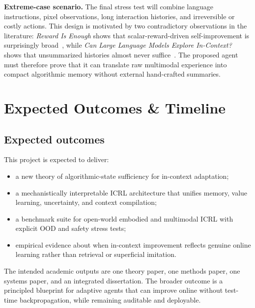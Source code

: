 \documentclass[10pt,twocolumn,letterpaper]{article}
\begin{document}
\textbf{Extreme-case scenario.}
The final stress test will combine language instructions, pixel observations, long interaction histories, and irreversible or costly actions. This design is motivated by two contradictory observations in the literature: \emph{Reward Is Enough} shows that scalar-reward-driven self-improvement is surprisingly broad~\cite{song2025reward}, while \emph{Can Large Language Models Explore In-Context?} shows that unsummarized histories almost never suffice~\cite{krishnamurthy2024explore}. The proposed agent must therefore prove that it can translate raw multimodal experience into compact algorithmic memory without external hand-crafted summaries.

\section{Expected Outcomes \& Timeline}
\subsection{Expected outcomes}
This project is expected to deliver:
\begin{itemize}[leftmargin=1.2em]
\item a new theory of algorithmic-state sufficiency for in-context adaptation;
\item a mechanistically interpretable ICRL architecture that unifies memory, value learning, uncertainty, and context compilation;
\item a benchmark suite for open-world embodied and multimodal ICRL with explicit OOD and safety stress tests;
\item empirical evidence about when in-context improvement reflects genuine online learning rather than retrieval or superficial imitation.
\end{itemize}

The intended academic outputs are one theory paper, one methods paper, one systems paper, and an integrated dissertation. The broader outcome is a principled blueprint for adaptive agents that can improve online without test-time backpropagation, while remaining auditable and deployable.
\end{document}
